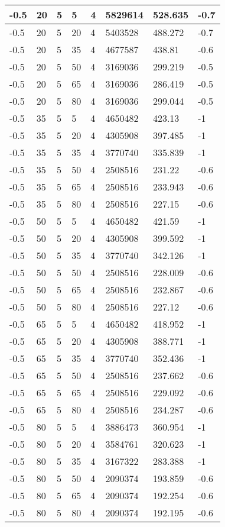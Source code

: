 \begin{longtable}{|p{1.4cm}|p{1.4cm}|p{1.4cm}|p{1.4cm}|p{1.4cm}|p{1.4cm}|p{1.4cm}|p{1.5cm}|}
        -0.5 & 20 & 5 & 5 & 4 & 5829614 & 528.635 & -0.7 \\ \hline
        -0.5 & 20 & 5 & 20 & 4 & 5403528 & 488.272 & -0.7 \\ \hline
        -0.5 & 20 & 5 & 35 & 4 & 4677587 & 438.81 & -0.6 \\ \hline
        -0.5 & 20 & 5 & 50 & 4 & 3169036 & 299.219 & -0.5 \\ \hline
        -0.5 & 20 & 5 & 65 & 4 & 3169036 & 286.419 & -0.5 \\ \hline
        -0.5 & 20 & 5 & 80 & 4 & 3169036 & 299.044 & -0.5 \\ \hline
        -0.5 & 35 & 5 & 5 & 4 & 4650482 & 423.13 & -1 \\ \hline
        -0.5 & 35 & 5 & 20 & 4 & 4305908 & 397.485 & -1 \\ \hline
        -0.5 & 35 & 5 & 35 & 4 & 3770740 & 335.839 & -1 \\ \hline
        -0.5 & 35 & 5 & 50 & 4 & 2508516 & 231.22 & -0.6 \\ \hline
        -0.5 & 35 & 5 & 65 & 4 & 2508516 & 233.943 & -0.6 \\ \hline
        -0.5 & 35 & 5 & 80 & 4 & 2508516 & 227.15 & -0.6 \\ \hline
        -0.5 & 50 & 5 & 5 & 4 & 4650482 & 421.59 & -1 \\ \hline
        -0.5 & 50 & 5 & 20 & 4 & 4305908 & 399.592 & -1 \\ \hline
        -0.5 & 50 & 5 & 35 & 4 & 3770740 & 342.126 & -1 \\ \hline
        -0.5 & 50 & 5 & 50 & 4 & 2508516 & 228.009 & -0.6 \\ \hline
        -0.5 & 50 & 5 & 65 & 4 & 2508516 & 232.867 & -0.6 \\ \hline
        -0.5 & 50 & 5 & 80 & 4 & 2508516 & 227.12 & -0.6 \\ \hline
        -0.5 & 65 & 5 & 5 & 4 & 4650482 & 418.952 & -1 \\ \hline
        -0.5 & 65 & 5 & 20 & 4 & 4305908 & 388.771 & -1 \\ \hline
        -0.5 & 65 & 5 & 35 & 4 & 3770740 & 352.436 & -1 \\ \hline
        -0.5 & 65 & 5 & 50 & 4 & 2508516 & 237.662 & -0.6 \\ \hline
        -0.5 & 65 & 5 & 65 & 4 & 2508516 & 229.092 & -0.6 \\ \hline
        -0.5 & 65 & 5 & 80 & 4 & 2508516 & 234.287 & -0.6 \\ \hline
        -0.5 & 80 & 5 & 5 & 4 & 3886473 & 360.954 & -1 \\ \hline
        -0.5 & 80 & 5 & 20 & 4 & 3584761 & 320.623 & -1 \\ \hline
        -0.5 & 80 & 5 & 35 & 4 & 3167322 & 283.388 & -1 \\ \hline
        -0.5 & 80 & 5 & 50 & 4 & 2090374 & 193.859 & -0.6 \\ \hline
        -0.5 & 80 & 5 & 65 & 4 & 2090374 & 192.254 & -0.6 \\ \hline
        -0.5 & 80 & 5 & 80 & 4 & 2090374 & 192.195 & -0.6 \\ \hline
\bottomrule
\end{longtable}
